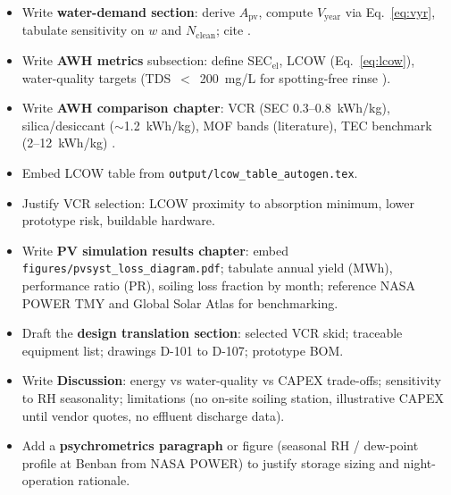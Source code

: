 \documentclass[11pt,a4paper]{article}
\begin{document}
\begin{description}[style=nextline,leftmargin=2cm,font=\normalfont\bfseries]
  \item[Day~8 \textnormal{(Thu 30 Apr)}]
  \begin{itemize}[nosep]
    \item Write \textbf{water-demand section}: derive $A_{\mathrm{pv}}$, compute $V_{\mathrm{year}}$ via Eq.~\eqref{eq:vyr}, tabulate sensitivity on $w$ and $N_{\mathrm{clean}}$; cite \cite{mejia2021cleaning,kazem2023soiling}.
    \item Write \textbf{AWH metrics} subsection: define SEC$_{\mathrm{el}}$, LCOW (Eq.~\eqref{eq:lcow}), water-quality targets (TDS~$<$~200~mg/L for spotting-free rinse \cite{beattie2012waterspots}).
  \end{itemize}

  \item[Day~9 \textnormal{(Fri 1 May)}]
  \begin{itemize}[nosep]
    \item Write \textbf{AWH comparison chapter}: VCR (SEC 0.3--0.8~kWh/kg), silica/desiccant ($\sim$1.2~kWh/kg), MOF bands (literature), TEC benchmark (2--12~kWh/kg) \cite{bagheri2024sec,zhou2020review,feng2022review,alqaed2023awg}.
    \item Embed LCOW table from \texttt{output/lcow\_table\_autogen.tex}.
    \item Justify VCR selection: LCOW proximity to absorption minimum, lower prototype risk, buildable hardware.
  \end{itemize}

  \item[Day~10 \textnormal{(Sat 2 May)}]
  \begin{itemize}[nosep]
    \item Write \textbf{PV simulation results chapter}: embed \texttt{figures/pvsyst\_loss\_diagram.pdf}; tabulate annual yield (MWh), performance ratio (PR), soiling loss fraction by month; reference NASA POWER TMY \cite{nasa_power} and Global Solar Atlas \cite{globalsolaratlas} for benchmarking.
    \item Draft the \textbf{design translation section}: selected VCR skid; traceable equipment list; drawings D-101 to D-107; prototype BOM.
  \end{itemize}

  \item[Day~11 \textnormal{(Sun 3 May)}]
  \begin{itemize}[nosep]
    \item Write \textbf{Discussion}: energy vs water-quality vs CAPEX trade-offs; sensitivity to RH seasonality; limitations (no on-site soiling station, illustrative CAPEX until vendor quotes, no effluent discharge data).
    \item Add a \textbf{psychrometrics paragraph} or figure (seasonal RH / dew-point profile at Benban from NASA POWER) to justify storage sizing and night-operation rationale.
  \end{itemize}


\end{description}
\end{document}
